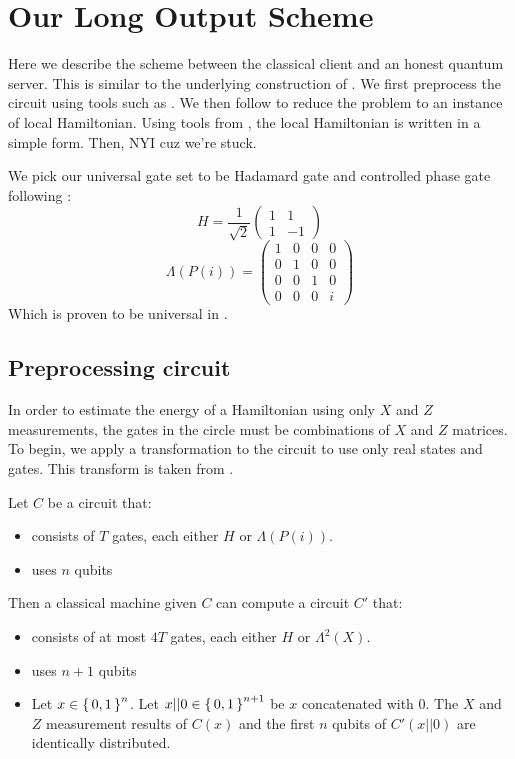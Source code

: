 \section{Our Long Output Scheme}

Here we describe the scheme between the classical client and an honest quantum server. This is similar to the underlying construction of \cite{mahadev_delegation}. We first preprocess the circuit using tools such as \cite{quant-ph/0301040}. We then follow \cite{kitaev2002classical} to reduce the problem to an instance of local Hamiltonian. Using tools from \cite{PhysRevA.93.022326}, the local Hamiltonian is written in a simple form. Then, NYI cuz we're stuck. 

We pick our universal gate set to be Hadamard gate and controlled phase gate following \cite{quant-ph/0301040}:
$$H=\frac{1}{\sqrt{2}}\begin{pmatrix}1&1\\1&-1\end{pmatrix}$$
$$\Lambda(P(i))=\begin{pmatrix}1&0&0&0\\0&1&0&0\\0&0&1&0\\0&0&0&i\end{pmatrix}$$
Which is proven to be universal in \cite{kitaev_1997}.

\subsection{Preprocessing circuit}

In order to estimate the energy of a Hamiltonian using only $X$ and $Z$ measurements, the gates in the circle must be combinations of $X$ and $Z$ matrices. To begin, we apply a transformation to the circuit to use only real states and gates. This transform is taken from \cite{quant-ph/0301040}.

\begin{theorem}
	Let $C$ be a circuit that:
	\begin{itemize}
		\item consists of $T$ gates, each either $H$ or $\Lambda(P(i))$.
		\item uses $n$ qubits
	\end{itemize}
	Then a classical machine given $C$ can compute a circuit $C'$ that:
	\begin{itemize}
		\item consists of at most $4T$ gates, each either $H$ or $\Lambda^2(X)$.
		\item uses $n+1$ qubits
		\item Let $x\in\set{0,1}^n$. Let $x||0\in\set{0,1}^{n+1}$ be $x$ concatenated with $0$. The $X$ and $Z$ measurement results of $C(x)$ and the first $n$ qubits of $C'(x||0)$ are identically distributed.
	\end{itemize}
\end{theorem}

